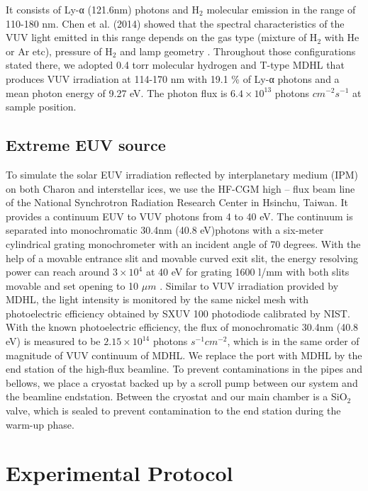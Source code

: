 It consists of Ly-α (121.6nm) photons and H$_2$ molecular emission in the range of 110-180 nm. Chen et al. (2014) showed that the spectral characteristics of the VUV light emitted in this range depends on the gas type (mixture of H$_2$ with He or Ar etc), pressure of H$_2$ and lamp geometry \cite{chen2013vacuum}. Throughout those configurations stated there, we adopted 0.4 torr molecular hydrogen and T-type MDHL that produces VUV irradiation at 114-170 nm with 19.1 \% of Ly-α photons and a mean photon energy of 9.27 eV. The photon flux is $6.4 \times 10^{13}$ photons $cm^{-2} s^{-1}$ at sample position.

\subsection{Extreme EUV source}
\label{sec:Extreme_EUV_source}

To simulate the solar EUV irradiation reflected by interplanetary medium (IPM) on both Charon and interstellar ices, we use the HF-CGM high – flux beam line of the National Synchrotron Radiation Research Center in Hsinchu, Taiwan. It provides a continuum EUV to VUV photons from 4 to 40 eV. The continuum is separated into monochromatic 30.4nm (40.8 eV)photons with a six-meter cylindrical grating monochrometer with an incident angle of 70 degrees. With the help of a movable entrance slit and movable curved exit slit, the energy resolving power can reach around $3 \times 10^4$ at 40 eV for grating 1600 l/mm with both slits movable and set opening to 10 $\mu m$ \cite{hsieh1998design}. Similar to VUV irradiation provided by MDHL, the light intensity is monitored by the same nickel mesh with photoelectric efficiency obtained by SXUV 100 photodiode calibrated by NIST. With the known photoelectric efficiency, the flux of monochromatic 30.4nm (40.8 eV) is measured to be $2.15 \times 10^{14}$ photons $s^{-1} cm^{-2}$, which is in the same order of magnitude of VUV continuum of MDHL. We replace the port with MDHL by the end station of the high-flux beamline. To prevent contaminations in the pipes and bellows, we place a cryostat backed up by a scroll pump between our system and the beamline endstation. Between the cryostat and our main chamber is a SiO$_2$ valve, which is sealed to prevent contamination to the end station during the warm-up phase.

\section{Experimental Protocol}
\label{sec:Experimental_Protocol}

